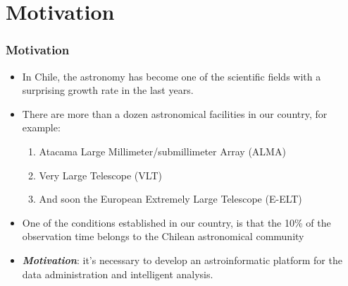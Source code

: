 \section{Motivation}

\begin{frame}
\frametitle{Motivation}

\begin{itemize}
	\item In Chile, the astronomy has become one of the scientific fields with a surprising growth rate in the last years.
	\item There are more than a dozen astronomical facilities in our country, for example:
		\begin{enumerate}
			\addtolength{\itemindent}{1cm}
			\item Atacama Large Millimeter/submillimeter Array (ALMA)
			\item Very Large Telescope (VLT)
			\item And soon the European Extremely Large Telescope (E-ELT)
		\end{enumerate}
	\item One of the conditions established in our country, is that the 10\% of the observation
		time belongs to the Chilean astronomical community
	\item \emph{\textbf{Motivation}}: it's necessary to develop an astroinformatic platform for the data administration 
		and intelligent analysis.
\end{itemize}

\end{frame}
